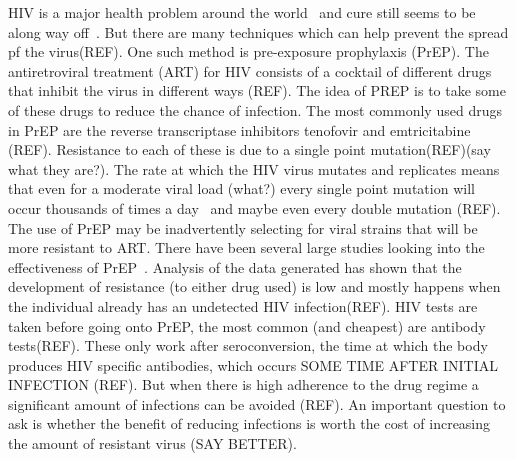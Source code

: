 \documentclass[DIV=15]{scrartcl}
\begin{document}
HIV is a major health problem around  the world~\cite{unaids} and cure still seems to be along way off~\cite{passaes2014}. But there are many techniques which can help prevent the spread pf the virus(REF). One such method is pre-exposure prophylaxis (PrEP). The antiretroviral treatment (ART) for HIV consists of a cocktail of different drugs that inhibit the virus in different ways (REF). The idea of PREP is to take some of these drugs to reduce the chance of infection. 
The most commonly used  drugs in PrEP are the reverse transcriptase inhibitors  tenofovir and emtricitabine (REF). Resistance to each of these  is due to a single point mutation(REF)(say what they are?). The rate at which the HIV virus mutates and replicates means that even for a moderate viral load (what?) every single point mutation will occur thousands of times a day~\cite{coffin1995} and maybe even every double mutation (REF).  The use of PrEP may  be inadvertently selecting for viral  strains that will be more resistant to ART. There have been several large studies looking into the effectiveness of PrEP~\cite{iprex2011,partners2012}. Analysis of the data  generated has shown that the development of resistance (to either drug used) is low and mostly happens when the individual already has an undetected HIV infection(REF). HIV tests are taken before going onto PrEP, the most common (and cheapest) are antibody tests(REF). These only work after seroconversion, the time at which the body produces HIV specific antibodies, which occurs SOME TIME AFTER INITIAL INFECTION (REF). 
 But when there is high adherence to the drug regime a significant amount of infections can be avoided (REF).  An important question to ask is whether the benefit of reducing infections is worth the cost of increasing the amount of  resistant virus (SAY BETTER).
 
\end{document}
